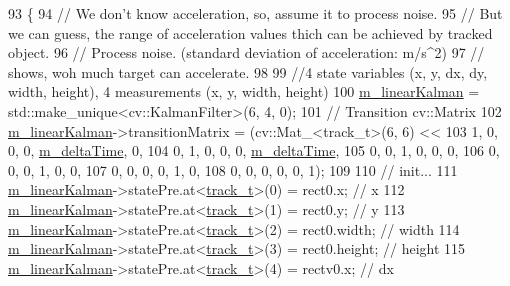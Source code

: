 \begin{DoxyCode}
93 \{
94     \textcolor{comment}{// We don't know acceleration, so, assume it to process noise.}
95     \textcolor{comment}{// But we can guess, the range of acceleration values thich can be achieved by tracked object.}
96     \textcolor{comment}{// Process noise. (standard deviation of acceleration: m/s^2)}
97     \textcolor{comment}{// shows, woh much target can accelerate.}
98 
99     \textcolor{comment}{//4 state variables (x, y, dx, dy, width, height), 4 measurements (x, y, width, height)}
100     \mbox{\hyperlink{class_t_kalman_filter_aec607aacb57ef1f78e514c6b3ef18435}{m\_linearKalman}} = std::make\_unique<cv::KalmanFilter>(6, 4, 0);
101     \textcolor{comment}{// Transition cv::Matrix}
102     \mbox{\hyperlink{class_t_kalman_filter_aec607aacb57ef1f78e514c6b3ef18435}{m\_linearKalman}}->transitionMatrix = (cv::Mat\_<track\_t>(6, 6) <<
103                                         1, 0, 0, 0, \mbox{\hyperlink{class_t_kalman_filter_a7335e3bd7a695ebaf5eaa93c42e39eae}{m\_deltaTime}}, 0,
104                                         0, 1, 0, 0, 0,           \mbox{\hyperlink{class_t_kalman_filter_a7335e3bd7a695ebaf5eaa93c42e39eae}{m\_deltaTime}},
105                                         0, 0, 1, 0, 0,           0,
106                                         0, 0, 0, 1, 0,           0,
107                                         0, 0, 0, 0, 1,           0,
108                                         0, 0, 0, 0, 0,           1);
109 
110     \textcolor{comment}{// init...}
111     \mbox{\hyperlink{class_t_kalman_filter_aec607aacb57ef1f78e514c6b3ef18435}{m\_linearKalman}}->statePre.at<\mbox{\hyperlink{defines_8h_a7ce9c8817b42ab418e61756f579549ab}{track\_t}}>(0) = rect0.x;      \textcolor{comment}{// x}
112     \mbox{\hyperlink{class_t_kalman_filter_aec607aacb57ef1f78e514c6b3ef18435}{m\_linearKalman}}->statePre.at<\mbox{\hyperlink{defines_8h_a7ce9c8817b42ab418e61756f579549ab}{track\_t}}>(1) = rect0.y;      \textcolor{comment}{// y}
113     \mbox{\hyperlink{class_t_kalman_filter_aec607aacb57ef1f78e514c6b3ef18435}{m\_linearKalman}}->statePre.at<\mbox{\hyperlink{defines_8h_a7ce9c8817b42ab418e61756f579549ab}{track\_t}}>(2) = rect0.width;  \textcolor{comment}{// width}
114     \mbox{\hyperlink{class_t_kalman_filter_aec607aacb57ef1f78e514c6b3ef18435}{m\_linearKalman}}->statePre.at<\mbox{\hyperlink{defines_8h_a7ce9c8817b42ab418e61756f579549ab}{track\_t}}>(3) = rect0.height; \textcolor{comment}{// height}
115     \mbox{\hyperlink{class_t_kalman_filter_aec607aacb57ef1f78e514c6b3ef18435}{m\_linearKalman}}->statePre.at<\mbox{\hyperlink{defines_8h_a7ce9c8817b42ab418e61756f579549ab}{track\_t}}>(4) = rectv0.x;     \textcolor{comment}{// dx}

\end{DoxyCode}
